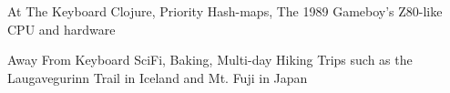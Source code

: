 
\begin{cvskills}

	\cvskill
	{At The Keyboard}
	{Clojure, Priority Hash-maps, The 1989 Gameboy's Z80-like CPU and hardware}

	\cvskill
	{Away From Keyboard}
	{SciFi, Baking, Multi-day Hiking Trips such as the Laugavegurinn Trail in Iceland and Mt. Fuji in Japan}

\end{cvskills}

